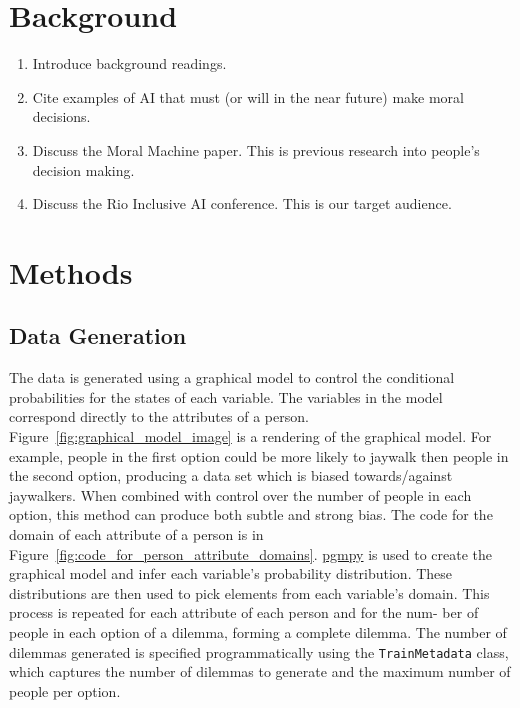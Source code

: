 \documentclass{report}
\newcommand{\code}{\texttt}
\begin{document}
\chapter{Background}

\begin{enumerate}
    \item Introduce background readings.
    
    \item Cite examples of AI that must (or will in the near future) make moral decisions.
    
    \item Discuss the Moral Machine paper. This is previous research into people's decision making.
    
    \item Discuss the Rio Inclusive AI conference. This is our target audience.
\end{enumerate}

\chapter{Methods}

\section{Data Generation}

The data is generated using a graphical model to control the conditional probabilities for the
states of each variable. The variables in the model correspond directly to the attributes of a
person. Figure~\ref{fig:graphical_model_image} is a rendering of the graphical model. For example,
people in the first option could be more likely to jaywalk then people in the second option,
producing a data set which is biased towards/against jaywalkers. When combined with control over the
number of people in each option, this method can produce both subtle and strong bias. The code for
the domain of each attribute of a person is in Figure~\ref{fig:code_for_person_attribute_domains}.
\href{https://github.com/pgmpy/pgmpy}{pgmpy} is used to create the graphical model and infer each
variable’s probability distribution. These distributions are then used to pick elements from each
variable’s domain. This process is repeated for each attribute of each person and for the num- ber
of people in each option of a dilemma, forming a complete dilemma. The number of dilemmas generated
is specified programmatically using the \code{TrainMetadata} class, which captures the number of
dilemmas to generate and the maximum number of people per option.
\end{document}
